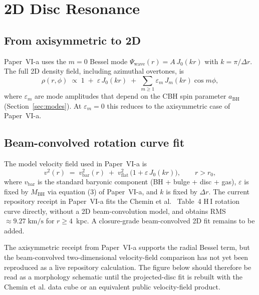 \documentclass[11pt,a4paper]{article}
\begin{document}
\section{2D Disc Resonance}
\label{sec:2d}

\subsection{From axisymmetric to 2D}

Paper~VI-a uses the $m=0$ Bessel mode $\Psi_\mathrm{wave}(r) = A\,J_0(kr)$ with
$k = \pi/\Delta r$.  The full 2D density field, including azimuthal overtones, is
\begin{equation}
  \rho(r,\phi) \;\propto\;
  1 \;+\; \varepsilon\,J_0(kr)
  \;+\; \sum_{m\geq1} \varepsilon_m\,J_m(kr)\cos m\phi,
  \label{eq:density2d}
\end{equation}
where $\varepsilon_m$ are mode amplitudes that depend on the CBH spin parameter
$a_\mathrm{BH}$ (Section~\ref{sec:modes}).  At $\varepsilon_m = 0$ this reduces to the
axisymmetric case of Paper~VI-a.

\subsection{Beam-convolved rotation curve fit}

The model velocity field used in Paper~VI-a is
\begin{equation}
  v^2(r) \;=\; v_\mathrm{bar}^2(r)
  \;+\; v_\mathrm{flat}^2\,\bigl(1 + \varepsilon\,J_0(kr)\bigr),
  \qquad r > r_0,
  \label{eq:vmodel}
\end{equation}
where $v_\mathrm{bar}$ is the standard baryonic component (BH + bulge + disc + gas),
$\varepsilon$ is fixed by $M_\mathrm{BH}$ via equation (3) of Paper~VI-a, and $k$ is
fixed by $\Delta r$.  The current repository receipt in Paper~VI-a fits the
Chemin et al.~\cite{chemin2009} Table~4 H\,I rotation curve directly, without a 2D
beam-convolution model, and obtains RMS $\approx9.27\;\mathrm{km/s}$ for
$r\ge4$~kpc.  A closure-grade beam-convolved 2D fit remains to be added.

\begin{gapbox}
The axisymmetric receipt from Paper~VI-a supports the radial Bessel term, but the
beam-convolved two-dimensional velocity-field comparison has not yet been reproduced as a
live repository calculation.  The figure below should therefore be read as a morphology
schematic until the projected-disc fit is rebuilt with the Chemin et al. data cube or an
equivalent public velocity-field product.
\end{gapbox}
\end{document}
